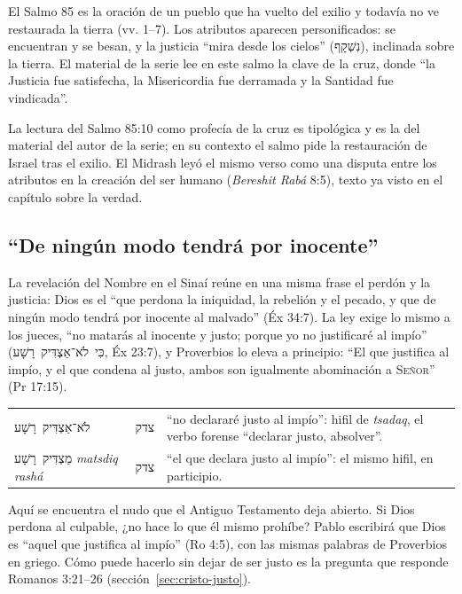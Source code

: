 \documentclass[11pt,letterpaper]{article}
\newcommand{\heb}[1]{\mbox{\foreignlanguage{hebrew}{#1}}}
\newcommand{\SENOR}{\textsc{Señor}}
\begin{document}
El Salmo 85 es la oración de un pueblo que ha vuelto del exilio y todavía no ve restaurada la tierra (vv. 1--7). Los atributos aparecen personificados: se encuentran y se besan, y la justicia ``mira desde los cielos'' (\heb{נִשְׁקָף}), inclinada sobre la tierra. El material de la serie lee en este salmo la clave de la cruz, donde ``la Justicia fue satisfecha, la Misericordia fue derramada y la Santidad fue vindicada''.

\begin{nota}[Precisión]
La lectura del Salmo 85:10 como profecía de la cruz es tipológica y es la del material del autor de la serie; en su contexto el salmo pide la restauración de Israel tras el exilio. El Midrash leyó el mismo verso como una disputa entre los atributos en la creación del ser humano (\emph{Bereshit Rabá} 8:5), texto ya visto en el capítulo sobre la verdad.
\end{nota}

\subsection{``De ningún modo tendrá por inocente''}
La revelación del Nombre en el Sinaí reúne en una misma frase el perdón y la justicia: Dios es el ``que perdona la iniquidad, la rebelión y el pecado, y que de ningún modo tendrá por inocente al malvado'' (Éx 34:7). La ley exige lo mismo a los jueces, ``no matarás al inocente y justo; porque yo no justificaré al impío'' (\heb{כִּי לֹא־אַצְדִּיק רָשָׁע}, Éx 23:7), y Proverbios lo eleva a principio: ``El que justifica al impío, y el que condena al justo, ambos son igualmente abominación a \SENOR'' (Pr 17:15).

\begin{filologia}[Éx 23:7; Pr 17:15]
\begin{tabular}{@{}L{3.2cm}L{1.6cm}L{10cm}@{}}
\heb{לֹא־אַצְדִּיק רָשָׁע} & \heb{צדק} & ``no declararé justo al impío'': hifil de \emph{tsadaq}, el verbo forense ``declarar justo, absolver''. \\[2pt]
\heb{מַצְדִּיק רָשָׁע} \emph{matsdiq rashá} & \heb{צדק} & ``el que declara justo al impío'': el mismo hifil, en participio. \\
\end{tabular}
\end{filologia}

Aquí se encuentra el nudo que el Antiguo Testamento deja abierto. Si Dios perdona al culpable, ¿no hace lo que él mismo prohíbe? Pablo escribirá que Dios es ``aquel que justifica al impío'' (Ro 4:5), con las mismas palabras de Proverbios en griego. Cómo puede hacerlo sin dejar de ser justo es la pregunta que responde Romanos 3:21--26 (sección~\ref{sec:cristo-justo}).
\end{document}
